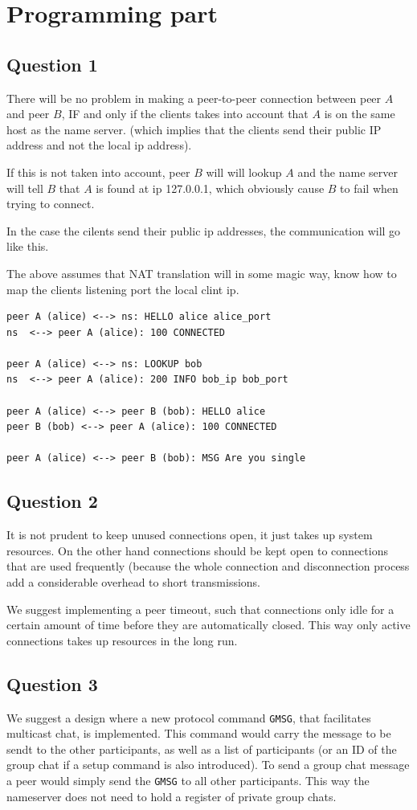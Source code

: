 \section{Programming part}
\subsection{Question 1}
There will be no problem in making a peer-to-peer connection between peer $A$
and peer $B$, IF and only if the clients takes into account that $A$ is on the
same host as the name server. (which implies that the clients send their public IP
address and not the local ip address).

If this is not taken into account, peer $B$ will will lookup $A$ and the name
server will tell $B$ that $A$ is found at ip 127.0.0.1, which obviously cause
$B$ to fail when trying to connect.

In the case the cilents send their public ip addresses, the communication will
go like this.

The above assumes that NAT translation will in some magic way, know how to
map the clients listening port the local clint ip.

\begin{lstlisting}
peer A (alice) <--> ns: HELLO alice alice_port
ns  <--> peer A (alice): 100 CONNECTED

peer A (alice) <--> ns: LOOKUP bob
ns  <--> peer A (alice): 200 INFO bob_ip bob_port

peer A (alice) <--> peer B (bob): HELLO alice
peer B (bob) <--> peer A (alice): 100 CONNECTED

peer A (alice) <--> peer B (bob): MSG Are you single
\end{lstlisting}

\subsection{Question 2}
It is not prudent to keep unused connections open, it just takes up system
resources. On the other hand connections should be kept open to connections
that are used frequently (because the whole connection and disconnection
process add a considerable overhead to short transmissions.

We suggest implementing a peer timeout, such that connections only idle for a
certain amount of time before they are automatically closed. This way only
active connections takes up resources in the long run.

\subsection{Question 3}
We suggest a design where a new protocol command {\tt GMSG}, that facilitates
multicast chat, is implemented. This command would carry the message to be sendt
to the other participants, as well as a list of participants (or an ID of the
group chat if a setup command is also introduced). To send a group chat message
a peer would simply send the {\tt GMSG} to all other participants. This way the
nameserver does not need to hold a register of private group chats.

